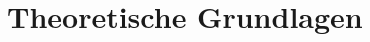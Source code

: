 \documentclass[main.tex]{subfiles}
\begin{document}
\section{Theoretische Grundlagen}
\end{document}

